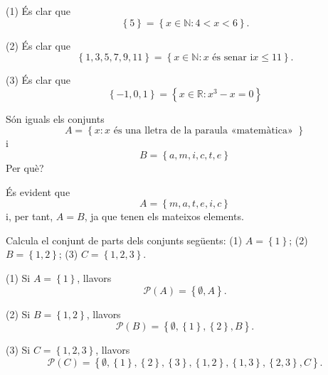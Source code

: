 \begin{solucio}
(1) És clar que%
\begin{equation*}
\left\{ 5\right\} =\left\{ x\in \mathbb{N}:4<x<6\right\} \text{.}
\end{equation*}

(2) És clar que%
\begin{equation*}
\left\{ 1,3,5,7,9,11\right\} =\left\{ x\in \mathbb{N}:x\text{ és senar i
}x\leq 11\right\} \text{.}
\end{equation*}

(3) És clar que%
\begin{equation*}
\left\{ -1,0,1\right\} =\left\{ x\in \mathbb{R}:x^{3}-x=0\right\}
\end{equation*}
\end{solucio}

\begin{exercici}
Són iguals els conjunts%
\begin{equation*}
A=\left\{ x:x\text{ és una lletra de la paraula «matemàtica» }\right\}
\end{equation*}%
i%
\begin{equation*}
B=\left\{ a,m,i,c,t,e\right\}
\end{equation*}%
Per què?
\end{exercici}

\begin{solucio}
És evident que%
\begin{equation*}
A=\left\{ m,a,t,e,i,c\right\}
\end{equation*}%
i, per tant, $A=B$, ja que tenen els mateixos elements.
\end{solucio}

\begin{exercici}
Calcula el conjunt de parts dels conjunts següents: (1) $A=\left\{
1\right\} $; (2) $B=\left\{ 1,2\right\} $; (3) $C=\left\{ 1,2,3\right\} $.
\end{exercici}

\begin{solucio}
(1) Si $A=\left\{ 1\right\} $, llavors%
\begin{equation*}
\mathcal{P}(A)=\left\{ \emptyset ,A\right\} \text{.}
\end{equation*}

(2) Si $B=\left\{ 1,2\right\} $, llavors%
\begin{equation*}
\mathcal{P}(B)=\left\{ \emptyset ,\left\{ 1\right\} ,\left\{ 2\right\}
,B\right\} \text{.}
\end{equation*}

(3) Si $C=\left\{ 1,2,3\right\} $, llavors%
\begin{equation*}
\mathcal{P}(C)=\left\{ \emptyset ,\left\{ 1\right\} ,\left\{ 2\right\}
,\left\{ 3\right\} ,\left\{ 1,2\right\} ,\left\{ 1,3\right\} ,\left\{
2,3\right\} ,C\right\} \text{.}
\end{equation*}
\end{solucio}

